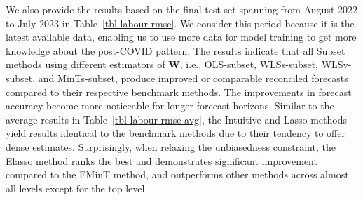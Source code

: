 \documentclass[
  12pt,
  11pt]{article}
\begin{document}
We also provide the results based on the final test set spanning from
August 2022 to July 2023 in Table~\ref{tbl-labour-rmse}. We consider
this period because it is the latest available data, enabling us to use
more data for model training to get more knowledge about the post-COVID
pattern. The results indicate that all Subset methods using different
estimators of \(\bm{W}\), i.e., OLS-subset, WLSs-subset, WLSv-subset,
and MinTs-subset, produce improved or comparable reconciled forecasts
compared to their respective benchmark methods. The improvements in
forecast accuracy become more noticeable for longer forecast horizons.
Similar to the average results in Table~\ref{tbl-labour-rmse-avg}, the
Intuitive and Lasso methods yield results identical to the benchmark
methods due to their tendency to offer dense estimates. Surprisingly,
when relaxing the unbiasedness constraint, the Elasso method ranks the
best and demonstrates significant improvement compared to the EMinT
method, and outperforms other methods across almost all levels except
for the top level.
\end{document}
